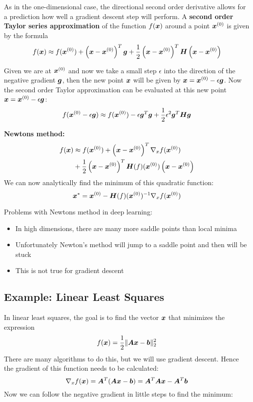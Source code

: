 \begin{multicols}{2}
	As in the one-dimensional case, the directional second order derivative allows for a prediction how well a gradient descent step will perform. A \textbf{second order Taylor series approximation} of the function $f(\bol{x})$ around a point $\bol{x}^{(0)}$ is given by the formula
	\[ f(\bol{x}) \approx f(\bol{x}^{(0)}) + \left( \bol{x}-\bol{x}^{(0)} \right)^T\bol{g}+
	\frac{1}{2} \left( \bol{x}-\bol{x}^{(0)} \right)^T\bol{H}\left( \bol{x}-\bol{x}^{(0)} \right) \]
	
	Given we are at $\bol{x}^{(0)}$ and now we take a small step $\epsilon$ into the direction of the negative gradient $\bol{g}$, then the new point $\bol{x}$ will be given by $\bol{x}=\bol{x}^{(0)}-\epsilon\bol{g}$.
	Now the second order Taylor approximation can be evaluated at this new point $\bol{x}=\bol{x}^{(0)}-\epsilon\bol{g}$:
	\[ f(\bol{x}^{(0)}-\epsilon\bol{g}) \approx f(\bol{x}^{(0)})-\epsilon \bol{g}^T\bol{g}+\frac{1}{2}
	\epsilon^2 \bol{g}^T\bol{H}\bol{g} \] 
	
	\textbf{Newtons method:}
	\begin{align*}
	f(\bol{x}) &\approx f(\bol{x}^{(0)}) + \left( \bol{x}-\bol{x}^{(0)} \right)^T \nabla_x f(\bol{x}^{(0)}) \\
	&+\frac{1}{2} \left( \bol{x}-\bol{x}^{(0)} \right)^T \bol{H}(f)(\bol{x}^{(0)})\left( \bol{x}-\bol{x}^{(0)} \right)
	\end{align*}
	We can now analytically find the minimum of this quadratic function:
	\[ \bol{x}^\ast = \bol{x}^{(0)} - \bol{H}(f)(\bol{x}^{(0)})^{-1}\nabla_x f(\bol{x}^{(0)}) \]
	
	Problems with Newtons method in deep learning:
	\begin{itemize}
		\item In high dimensions, there are many more saddle points than local minima
		\item Unfortunately Newton’s method will jump to a saddle point and then will be stuck
		\item This is not true for gradient descent
	\end{itemize}
	
	\subsection{Example: Linear Least Squares}
	In linear least squares, the goal is to find the vector $\bol{x}$ that minimizes the expression
	\[ f(\bol{x}) = \frac{1}{2} \lVert \bol{Ax}-\bol{b}\rVert_2^2 \]
	There are many algorithms to do this, but we will use gradient descent.
	Hence the gradient of this function needs to be calculated:
	\[ \nabla_xf(\bol{x}) =\bol{A}^T (\bol{Ax}-\bol{b}) = \bol{A}^T\bol{Ax}-\bol{A}^T\bol{b} \]
	Now we can follow the negative gradient in little steps to find the minimum:


\end{multicols}
